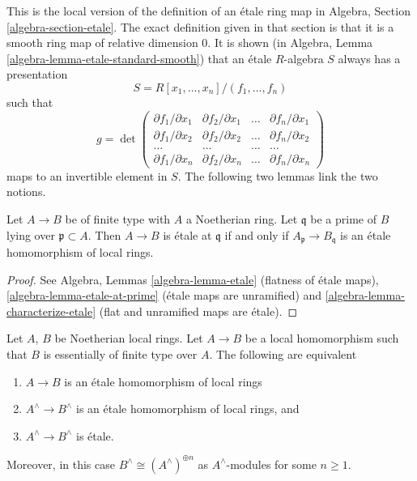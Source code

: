 \noindent
This is the local version of the definition of an \'etale ring map in
Algebra, Section \ref{algebra-section-etale}.
The exact definition
given in that section is that it is a smooth ring map of relative
dimension $0$. It is shown (in
Algebra, Lemma \ref{algebra-lemma-etale-standard-smooth})
that an \'etale $R$-algebra $S$ always has a presentation
$$
S = R[x_1, \ldots, x_n]/(f_1, \ldots, f_n)
$$
such that
$$
g =
\det
\left(
\begin{matrix}
\partial f_1/\partial x_1 &
\partial f_2/\partial x_1 &
\ldots &
\partial f_n/\partial x_1 \\
\partial f_1/\partial x_2 &
\partial f_2/\partial x_2 &
\ldots &
\partial f_n/\partial x_2 \\
\ldots & \ldots & \ldots & \ldots \\
\partial f_1/\partial x_n &
\partial f_2/\partial x_n &
\ldots &
\partial f_n/\partial x_n
\end{matrix}
\right)
$$
maps to an invertible element in $S$. The following two lemmas link the two
notions.

\begin{lemma}
\label{lemma-characterize-etale-Noetherian}
Let $A \to B$ be of finite type with $A$ a Noetherian ring.
Let $\mathfrak q$ be a prime of $B$ lying over $\mathfrak p \subset A$.
Then $A \to B$ is \'etale at $\mathfrak q$ if and only if
$A_{\mathfrak p} \to B_{\mathfrak q}$ is an \'etale homomorphism
of local rings.
\end{lemma}

\begin{proof}
See Algebra, Lemmas \ref{algebra-lemma-etale} (flatness of \'etale maps),
\ref{algebra-lemma-etale-at-prime} (\'etale maps are unramified)
and \ref{algebra-lemma-characterize-etale} (flat and unramified maps
are \'etale).
\end{proof}

\begin{lemma}
\label{lemma-characterize-etale-completions}
Let $A$, $B$ be Noetherian local rings.
Let $A \to B$ be a local homomorphism such that $B$ is essentially of
finite type over $A$.
The following are equivalent
\begin{enumerate}
\item $A \to B$ is an \'etale homomorphism of local rings
\item $A^\wedge \to B^\wedge$ is an \'etale homomorphism of local rings, and
\item $A^\wedge \to B^\wedge$ is \'etale.
\end{enumerate}
Moreover, in this case $B^\wedge \cong (A^\wedge)^{\oplus n}$ as
$A^\wedge$-modules for some $n \geq 1$.
\end{lemma}

